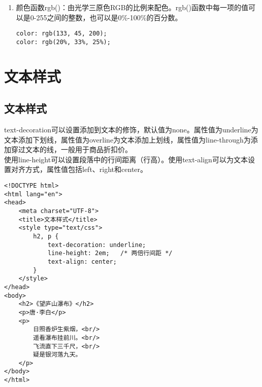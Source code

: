 \begin{enumerate}
    \item 颜色函数rgb()：由光学三原色RGB的比例来配色。rgb()函数中每一项的值可以是0-255之间的整数，也可以是0\%-100\%的百分数。 \\
          \begin{lstlisting}[style=htmlcssjs]
color: rgb(133, 45, 200);
color: rgb(20%, 33%, 25%);
    \end{lstlisting}
\end{enumerate}

\newpage

\section{文本样式}

\subsection{文本样式}

text-decoration可以设置添加到文本的修饰，默认值为none。属性值为underline为文本添加下划线，属性值为overline为文本添加上划线，属性值为line-through为添加穿过文本的线，一般用于商品折扣价。 \\

使用line-height可以设置段落中的行间距离（行高）。使用text-align可以为文本设置对齐方式，属性值包括left、right和center。

\begin{lstlisting}[style=htmlcssjs, title=文本样式]
<!DOCTYPE html>
<html lang="en">
<head>
    <meta charset="UTF-8">
    <title>文本样式</title>
    <style type="text/css">
        h2, p {
            text-decoration: underline;
            line-height: 2em;   /* 两倍行间距 */
            text-align: center;
        }
    </style>
</head>
<body>
    <h2>《望庐山瀑布》</h2>
    <p>唐·李白</p>
    <p>
        日照香炉生紫烟，<br/>
        遥看瀑布挂前川。<br/>
        飞流直下三千尺，<br/>
        疑是银河落九天。
    </p>
</body>
</html>
\end{lstlisting}

\newpage